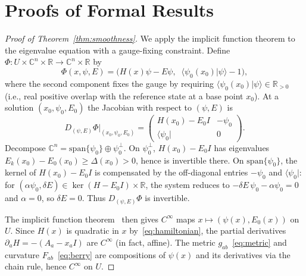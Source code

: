 \documentclass[3p]{elsarticle}
\newcommand{\bra}[1]{\langle#1|}
\newcommand{\braket}[2]{\langle#1|#2\rangle}
\newcommand{\R}{\mathbb{R}}
\newcommand{\C}{\mathbb{C}}
\begin{document}
\section{Proofs of Formal Results}\label{sec:proofs}

\begin{proof}[Proof of Theorem~\ref{thm:smoothness}]
We apply the implicit function theorem to the eigenvalue
equation with a gauge-fixing constraint.
Define $\Phi \colon U \times \C^n \times \R \to \C^n \times \R$ by
\[
  \Phi(x,\psi,E)
  = \bigl(H(x)\psi - E\psi,\;\; \braket{\psi_0(x_0)}{\psi} - 1\bigr),
\]
where the second component fixes the gauge by requiring
$\braket{\psi_0(x_0)}{\psi} \in \R_{>0}$ (i.e., real positive
overlap with the reference state at a base point $x_0$).  At a
solution $(x_0,\psi_0,E_0)$ the Jacobian with respect to
$(\psi,E)$ is
\[
  D_{(\psi,E)}\Phi\big|_{(x_0,\psi_0,E_0)}
  = \begin{pmatrix}
      H(x_0) - E_0 I & -\psi_0 \\[4pt]
      \bra{\psi_0} & 0
    \end{pmatrix}.
\]
Decompose $\C^n = \mathrm{span}\{\psi_0\} \oplus \psi_0^\perp$.
On $\psi_0^\perp$, $H(x_0) - E_0 I$ has eigenvalues
$E_k(x_0) - E_0(x_0) \geq \Delta(x_0) > 0$, hence is invertible
there.  On $\mathrm{span}\{\psi_0\}$, the kernel of $H(x_0) - E_0 I$
is compensated by the off-diagonal entries $-\psi_0$ and
$\bra{\psi_0}$: for $(\alpha\psi_0,\delta E) \in \ker(H-E_0I)\times\R$,
the system reduces to $-\delta E\,\psi_0 - \alpha\psi_0 = 0$ and
$\alpha = 0$, so $\delta E = 0$.  Thus $D_{(\psi,E)}\Phi$ is
invertible.

The implicit function theorem~\cite{kato1966} then gives
$C^\infty$ maps $x \mapsto (\psi(x), E_0(x))$ on $U$.
Since $H(x)$ is quadratic in $x$ by~\eqref{eq:hamiltonian},
the partial derivatives $\partial_a H = -(A_a - x_a I)$ are
$C^\infty$ (in fact, affine).  The metric
$g_{ab}$~\eqref{eq:metric} and curvature
$F_{ab}$~\eqref{eq:berry} are compositions of
$\psi(x)$ and its derivatives via the chain rule, hence
$C^\infty$ on $U$.
\end{proof}
\end{document}

